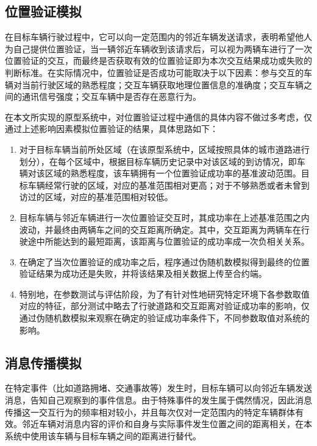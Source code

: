 \subsection{位置验证模拟}
在目标车辆行驶过程中，它可以向一定范围内的邻近车辆发送请求，表明希望他人为自己提供位置验证，当一辆邻近车辆收到该请求后，可以视为两辆车进行了一次位置验证的交互，而最终是否获取有效的位置验证即为本次交互结果成功或失败的判断标准。在实际情况中，位置验证是否成功可能取决于以下因素：参与交互的车辆对当前行驶区域的熟悉程度；交互车辆获取地理位置信息的准确度；交互车辆之间的通讯信号强度；交互车辆中是否存在恶意行为。

在本文所实现的原型系统中，对位置验证过程中通信的具体内容不做过多考虑，仅通过上述影响因素模拟位置验证的结果，具体思路如下：
\begin{enumerate}
    \item 对于目标车辆当前所处区域（在该原型系统中，区域按照具体的城市道路进行划分），在每个区域中，根据目标车辆历史记录中对该区域的到访情况，即车辆对该区域的熟悉程度，该车辆拥有一个位置验证成功率的基准波动范围。目标车辆经常行驶的区域，对应的基准范围相对更高；对于不够熟悉或者未曾到访过的区域，对应的基准范围相对较低。
    \item 目标车辆与邻近车辆进行一次位置验证交互时，其成功率在上述基准范围之内波动，并最终由两辆车之间的交互距离所确定。其中，交互距离为两辆车在行驶途中所能达到的最短距离，该距离与位置验证的成功率成一次负相关关系。
    \item 在确定了当次位置验证的成功率之后，程序通过伪随机数模拟得到最终的位置验证结果为成功还是失败，并将该结果及相关数据上传至合约端。
    \item 特别地，在参数测试与评估阶段，为了有针对性地研究特定环境下各参数取值对应的特征，部分测试中略去了行驶道路和交互距离对验证成功率的影响，仅通过伪随机数模拟来观察在确定的验证成功率条件下，不同参数取值对系统的影响。
\end{enumerate}

\subsection{消息传播模拟}

在特定事件（比如道路拥堵、交通事故等）发生时，目标车辆可以向邻近车辆发送消息，告知自己观察到的事件信息。由于特殊事件的发生属于偶然情况，因此消息传播这一交互行为的频率相对较小，并且每次仅对一定范围内的特定车辆群体有效。邻近车辆对消息内容的评价和自身与实际事件发生位置之间的距离相关，在本系统中使用该车辆与目标车辆之间的距离进行替代。

